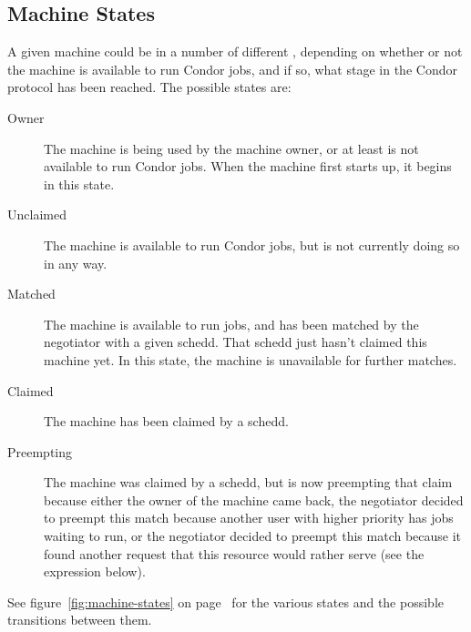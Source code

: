 \subsection{\label{sec:States}
Machine States}

A given machine could be in a number of different ,
depending on whether or not the machine is available to run Condor
jobs, and if so, what stage in the Condor protocol has been reached.
The possible states are:

\begin{description}
  
\item[Owner] The machine is being used by the machine owner, or at
  least is not available to run Condor jobs.  When the machine first
  starts up, it begins in this state.
  
\item[Unclaimed] The machine is available to run Condor jobs, but is
  not currently doing so in any way.
  
\item[Matched] The machine is available to run jobs, and has been
  matched by the negotiator with a given schedd.  That schedd just
  hasn't claimed this machine yet.  In this state, the machine is
  unavailable for further matches.

\item[Claimed] The machine has been claimed by a schedd. 
  
\item[Preempting] The machine was claimed by a schedd, but is now
  preempting that claim because either the owner of the machine came
  back, the negotiator decided to preempt this match because another
  user with higher priority has jobs waiting to run, or the negotiator
  decided to preempt this match because it found another request that
  this resource would rather serve (see the  expression
  below).

\end{description}

See figure~\ref{fig:machine-states} on page~\pageref{fig:machine-states}
for the various states and the possible transitions between them.

